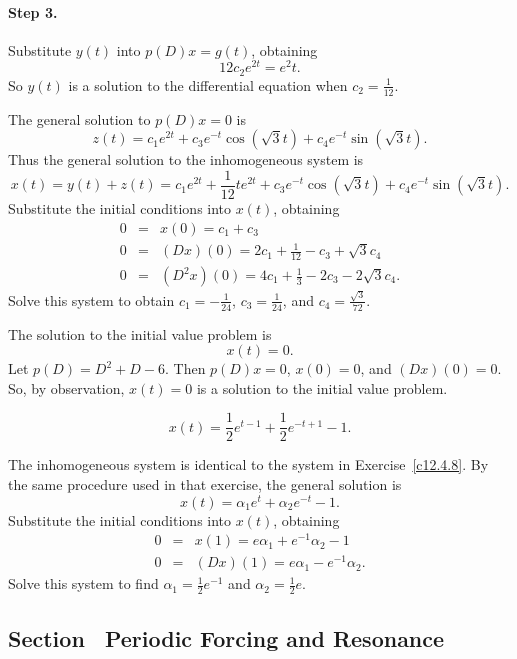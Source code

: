 \documentclass{ximera}
\begin{document}
\paragraph{Step 3.} Substitute $y(t)$ into $p(D)x = g(t)$, obtaining
\[
12c_2e^{2t} = e^2t.
\]
So $y(t)$ is a solution to the differential equation when $c_2 = \frac{1}{12}$.

\para The general solution to $p(D)x = 0$ is
\[
z(t) = c_1e^{2t} + c_3e^{-t}\cos(\sqrt{3}t) + c_4e^{-t}\sin(\sqrt{3}t).
\]
Thus the general solution to the inhomogeneous system is
\[
x(t) = y(t) + z(t) = c_1e^{2t} + \frac{1}{12}te^{2t}
+ c_3e^{-t}\cos(\sqrt{3}t) + c_4e^{-t}\sin(\sqrt{3}t).
\]
Substitute the initial conditions into $x(t)$, obtaining
\[
\begin{array}{rcl}
0 & = & x(0) = c_1 + c_3 \\
0 & = & (Dx)(0) = 2c_1 + \frac{1}{12} - c_3 + \sqrt{3}c_4 \\
0 & = & (D^2x)(0) = 4c_1 + \frac{1}{3} - 2c_3 - 2\sqrt{3}c_4.
\end{array}
\]
Solve this system to obtain $c_1 = -\frac{1}{24}$, $c_3 = \frac{1}{24}$,
and $c_4 = \frac{\sqrt{3}}{72}$.

 \ans The solution to the initial value problem is
\[
x(t) = 0.
\]
\soln Let $p(D) = D^2 + D - 6$.  Then $p(D)x = 0$, $x(0) = 0$, and
$(Dx)(0) = 0$.  So, by observation, $x(t) = 0$ is a solution to the
initial value problem.


 \ans
\[
x(t) = \frac{1}{2}e^{t - 1} + \frac{1}{2}e^{-t + 1} - 1.
\]

\soln The inhomogeneous system is identical to the system in
Exercise~\ref{c12.4.8}.  By the same procedure used in that exercise,
the general solution is
\[
x(t) = \alpha_1e^t + \alpha_2e^{-t} - 1.
\]
Substitute the initial conditions into $x(t)$, obtaining
\[
\begin{array}{rcl}
0 & = & x(1) = e\alpha_1 + e^{-1}\alpha_2 - 1 \\
0 & = & (Dx)(1) = e\alpha_1 - e^{-1}\alpha_2.
\end{array}
\]
Solve this system to find $\alpha_1 = \frac{1}{2}e^{-1}$ and
$\alpha_2 = \frac{1}{2}e$.



\subsection*{Section~\protect{\ref{S:resonance}} Periodic Forcing and Resonance}
\end{document}
